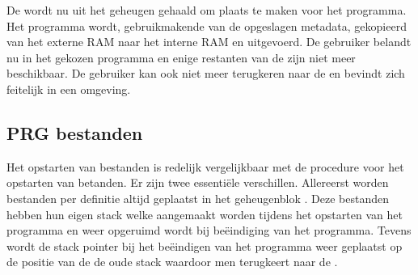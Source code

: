 De \launcher wordt nu uit het geheugen gehaald om plaats te maken voor het \cas programma. Het programma wordt, gebruikmakende van de opgeslagen metadata, gekopieerd van het externe RAM naar het interne RAM en uitgevoerd. De gebruiker belandt nu in het gekozen programma en enige restanten van de \launcher zijn niet meer beschikbaar. De gebruiker kan ook niet meer terugkeren naar de \launcher en bevindt zich feitelijk in een \basic omgeving.

%
%
\subsection{PRG bestanden}

Het opstarten van \prg bestanden is redelijk vergelijkbaar met de procedure voor het opstarten van \cas betanden. Er zijn twee essentiële verschillen. Allereerst worden \prg bestanden per definitie altijd geplaatst in het geheugenblok . Deze \prg bestanden hebben hun eigen stack welke aangemaakt worden tijdens het opstarten van het programma en weer opgeruimd wordt bij beëindiging van het programma. Tevens wordt de stack pointer bij het beëindigen van het programma weer geplaatst op de positie van de de oude stack waardoor men terugkeert naar de \launcher.

